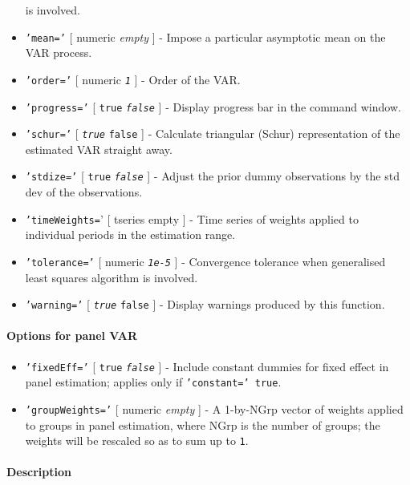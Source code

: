 \begin{itemize}
   is involved.
 \item
   \texttt{'mean='} {[} numeric \textbar{} \emph{empty} {]} - Impose a
   particular asymptotic mean on the VAR process.
 \item
   \texttt{'order='} {[} numeric \textbar{} \emph{\texttt{1}} {]} - Order
   of the VAR.
 \item
   \texttt{'progress='} {[} \texttt{true} \textbar{}
   \emph{\texttt{false}} {]} - Display progress bar in the command
   window.
 \item
   \texttt{'schur='} {[} \emph{\texttt{true}} \textbar{} \texttt{false}
   {]} - Calculate triangular (Schur) representation of the estimated VAR
   straight away.
 \item
   \texttt{'stdize='} {[} \texttt{true} \textbar{} \emph{\texttt{false}}
   {]} - Adjust the prior dummy observations by the std dev of the
   observations.
 \item
   \texttt{'timeWeights=}' {[} tseries \textbar{} empty {]} - Time series
   of weights applied to individual periods in the estimation range.
 \item
   \texttt{'tolerance='} {[} numeric \textbar{} \emph{\texttt{1e-5}} {]}
   - Convergence tolerance when generalised least squares algorithm is
   involved.
 \item
   \texttt{'warning='} {[} \emph{\texttt{true}} \textbar{} \texttt{false}
   {]} - Display warnings produced by this function.
 \end{itemize}
 
 \paragraph{Options for panel VAR}
 
 \begin{itemize}
 \item
   \texttt{'fixedEff='} {[} \texttt{true} \textbar{}
   \emph{\texttt{false}} {]} - Include constant dummies for fixed effect
   in panel estimation; applies only if \texttt{'constant=' true}.
 \item
   \texttt{'groupWeights='} {[} numeric \textbar{} \emph{empty} {]} - A
   1-by-NGrp vector of weights applied to groups in panel estimation,
   where NGrp is the number of groups; the weights will be rescaled so as
   to sum up to \texttt{1}.
 \end{itemize}
 
 \paragraph{Description}
 
